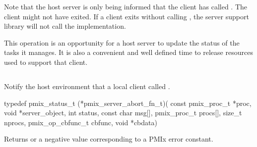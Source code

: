 Note that the host server is only being informed that the client has called .  The client might not have exited.  If a client
exits without calling , the server support library will not call the  implementation.

\advicermstart
This operation is an opportunity for a host server
to update the status of the tasks it manages.  It is also a convenient and well defined time to release resources used to support that client.
\advicermend


\subsection{}

\summary

Notify the host environment that a local client called .

\format

\cspecificstart
\begin{codepar}
typedef pmix_status_t (*pmix_server_abort_fn_t)(
                             const pmix_proc_t *proc,
                             void *server_object,
                             int status,
                             const char msg[],
                             pmix_proc_t procs[],
                             size_t nprocs,
                             pmix_op_cbfunc_t cbfunc,
                             void *cbdata)
\end{codepar}
\cspecificend


\begin{arglist}
\end{arglist}

Returns  or a negative value corresponding to a PMIx error constant.


